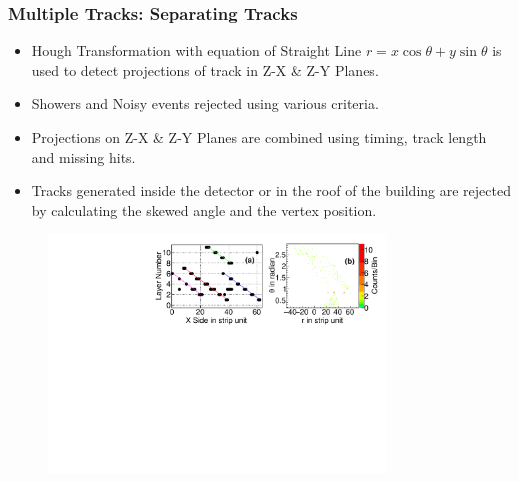 \documentclass{beamer}
\begin{document}
\begin{frame}
  \frametitle{Multiple Tracks: Separating Tracks}
  \begin{itemize} %
  \item Hough Transformation with equation of Straight Line
    $r=x\cos\theta+y\sin\theta$ is used to detect projections of track
    in Z-X \& Z-Y Planes.
  \item Showers and Noisy events rejected using various criteria.
  \item Projections on Z-X \& Z-Y Planes are combined using timing,
    track length and missing hits.
  \item Tracks generated inside the detector or in the roof of the
    building are rejected by calculating the skewed angle and the
    vertex position.
  \end{itemize}
  \begin{figure}[!h]
    \vspace{-6pt}
    \includegraphics[width=0.8\textwidth]{hough_plane_new.pdf}
  \end{figure}
\end{frame}
\end{document}
